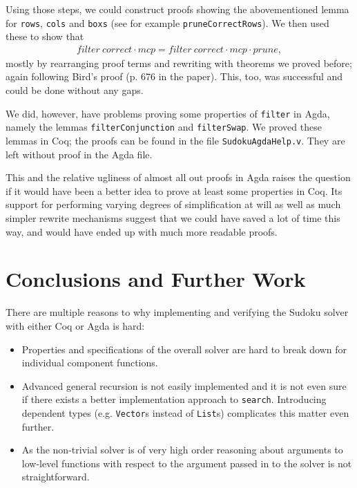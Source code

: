 \documentclass[a4paper,11pt]{article}
\begin{document}
Using those steps, we could construct proofs showing the abovementioned lemma for \texttt{rows}, \texttt{cols} and \texttt{boxs} (see for example \texttt{pruneCorrectRows}). We then used these to show that 
\begin{align*}
  filter~correct \cdot mcp = filter~correct \cdot mcp \cdot prune,
\end{align*}
mostly by rearranging proof terms and rewriting with theorems we proved before; again following Bird's proof (p. 676 in the paper). This, too, was successful and could be done without any gaps. 

We did, however, have problems proving some properties of \texttt{filter} in Agda, namely the lemmas \texttt{filterConjunction} and \texttt{filterSwap}. We proved these lemmas in Coq; the proofs can be found in the file \texttt{SudokuAgdaHelp.v}. They are left without proof in the Agda file. 

This and the relative ugliness of almost all out proofs in Agda raises the question if it would have been a better idea to prove at least some properties in Coq. Its support for performing varying degrees of simplification at will as well as much simpler rewrite mechanisms suggest that we could have saved a lot of time this way, and would have ended up with much more readable proofs.



\section{Conclusions and Further Work}
\label{sec:conc}
There are multiple reasons to why implementing and verifying the Sudoku solver with either Coq or Agda is hard:
\begin{itemize}
  \item Properties and specifications of the overall solver are hard to break down for individual component functions.
  \item Advanced general recursion is not easily implemented and it is not even sure if there exists a better implementation approach to \texttt{search}. Introducing dependent types (e.g. \texttt{Vector}s instead of \texttt{List}s) complicates this matter even further.
  \item As the non-trivial solver is of very high order reasoning about arguments to low-level functions with respect to the argument passed in to the solver is not straightforward.
\end{itemize}
\end{document}
